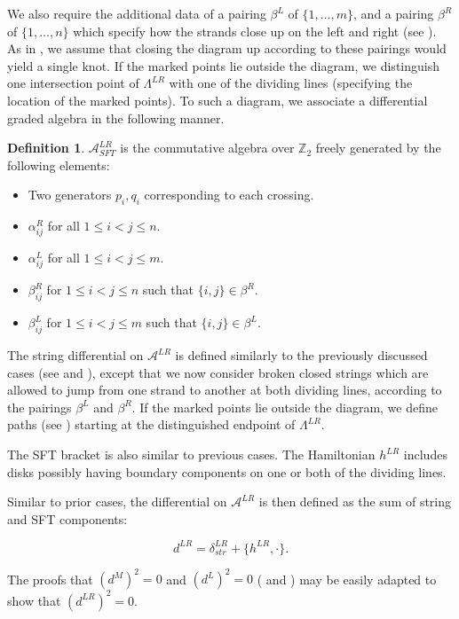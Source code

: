 \documentclass[a4paper,final, reqno]{amsart}
\theoremstyle{plain}
\theoremstyle{definition}
\newtheorem{Def}[Th]{Definition}
\newcommand{\A}{\mathcal{A}}
\begin{document}
		
		We also require the additional data of a pairing $\beta^L$ of $\{1,\dots, m\}$, and a pairing $\beta^R$ of $\{1,\dots, n\}$ which specify how the strands close up on the left and right (see ). As in , we assume that closing the diagram up according to these pairings would yield a single knot. If the marked points lie outside the diagram, we distinguish one intersection point of $\Lambda^{LR}$ with one of the dividing lines (specifying the location of the marked points). To such a diagram, we associate a differential graded algebra in the following manner.
		
		\begin{Def}
			
			$\A^{LR}_{SFT}$ is the commutative algebra over $\mathbb{Z}_2$ freely generated by the following elements:
			\begin{itemize}
				\item Two generators $p_i, q_i$ corresponding to each crossing.
				\item $\alpha_{ij}^R$ for all $1\leq i<j \leq n$.
				\item $\alpha_{ij}^L$ for all $1\leq i<j \leq m$.
				\item $\beta_{ij}^R$ for $1\leq i<j \leq n$ such that $\{i,j\} \in \beta^R$.
				\item $\beta_{ij}^L$ for $1\leq i<j \leq m$ such that $\{i,j\} \in \beta^L$. 
			\end{itemize}
		\end{Def}
		
		
		The string differential on $\A^{LR}$ is defined similarly to the previously discussed cases (see  and ), except that we now consider broken closed strings which are allowed to jump from one strand to another at both dividing lines, according to the pairings $\beta^L$ and $\beta^R$. If the marked points lie outside the diagram, we define paths (see ) starting at the distinguished endpoint of $\Lambda^{LR}$.
		
		The SFT bracket is also similar to previous cases. The Hamiltonian $h^{LR}$ includes disks possibly having boundary components on one or both of the dividing lines.
		
		Similar to prior cases, the differential on $\A^{LR}$ is then defined as the sum of string and SFT components:
		
		\[ d^{LR} = \delta_{str}^{LR} + \{h^{LR}, \cdot \}.\]
		
		The proofs that $(d^M)^2 = 0$ and $(d^L)^2 = 0$ ( and ) may be easily adapted to show that $(d^{LR})^2 = 0$.
		
\end{document}
